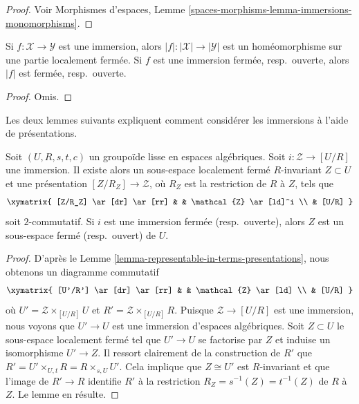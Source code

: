 \begin{proof}
Voir
Morphismes d'espaces,
Lemme \ref{spaces-morphisms-lemma-immersions-monomorphisms}.
\end{proof}

\begin{lemma}
\label{lemma-subspace-induced-topology}
Si $f : \mathcal{X} \to \mathcal{Y}$ est une immersion, alors
$|f| : |\mathcal{X}| \to |\mathcal{Y}|$ est un homéomorphisme
sur une partie localement fermée. Si $f$ est une immersion fermée, resp.\ ouverte,
alors $|f|$ est fermée, resp.\ ouverte.
\end{lemma}

\begin{proof}
Omis.
\end{proof}

\noindent
Les deux lemmes suivants expliquent comment considérer les
immersions à l'aide de présentations.

\begin{lemma}
\label{lemma-immersion-into-presentation}
Soit $(U, R, s, t, c)$ un groupoïde lisse en espaces algébriques.
Soit $i : \mathcal{Z} \to [U/R]$ une immersion.
Il existe alors un sous-espace localement fermé $R$-invariant
$Z \subset U$ et une présentation $[Z/R_Z] \to \mathcal{Z}$,
où $R_Z$ est la restriction de $R$ à $Z$, tels que
$$
\xymatrix{
[Z/R_Z] \ar[dr] \ar[rr] & & \mathcal{Z} \ar[ld]^i \\
& [U/R]
}
$$
soit $2$-commutatif. Si $i$ est une immersion fermée (resp.\ ouverte),
alors $Z$ est un sous-espace fermé (resp.\ ouvert) de $U$.
\end{lemma}

\begin{proof}
D'après le
Lemme \ref{lemma-representable-in-terms-presentations},
nous obtenons un diagramme commutatif
$$
\xymatrix{
[U'/R'] \ar[dr] \ar[rr] & & \mathcal{Z} \ar[ld] \\
& [U/R]
}
$$
où $U' = \mathcal{Z} \times_{[U/R]} U$ et
$R' = \mathcal{Z} \times_{[U/R]} R$.
Puisque $\mathcal{Z} \to [U/R]$ est une immersion, nous voyons que
$U' \to U$ est une immersion d'espaces algébriques. Soit $Z \subset U$
le sous-espace localement fermé tel que $U' \to U$ se factorise par
$Z$ et induise un isomorphisme $U' \to Z$.
Il ressort clairement de la construction de $R'$ que
$R' = U' \times_{U, t} R = R \times_{s, U} U'$.
Cela implique que $Z \cong U'$ est $R$-invariant et que l'image de
$R' \to R$ identifie $R'$ à la restriction
$R_Z = s^{-1}(Z) = t^{-1}(Z)$ de $R$ à $Z$. Le lemme en résulte.
\end{proof}

